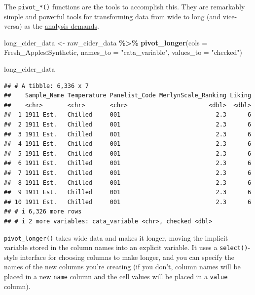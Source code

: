 \documentclass[
]{book}
\newenvironment{Shaded}{\begin{snugshade}}{\end{snugshade}}
\newcommand{\AttributeTok}[1]{\textcolor[rgb]{0.13,0.29,0.53}{#1}}
\newcommand{\FunctionTok}[1]{\textcolor[rgb]{0.13,0.29,0.53}{\textbf{#1}}}
\newcommand{\NormalTok}[1]{#1}
\newcommand{\OtherTok}[1]{\textcolor[rgb]{0.56,0.35,0.01}{#1}}
\newcommand{\SpecialCharTok}[1]{\textcolor[rgb]{0.81,0.36,0.00}{\textbf{#1}}}
\newcommand{\StringTok}[1]{\textcolor[rgb]{0.31,0.60,0.02}{#1}}
\begin{document}
The \texttt{pivot\_*()} functions are the tools to accomplish this. They are remarkably simple and powerful tools for transforming data from wide to long (and vice-versa) as the \protect\hyperlink{cider}{analysis demands}.

\begin{Shaded}
\begin{Highlighting}[]
\NormalTok{long\_cider\_data }\OtherTok{\textless{}{-}} 
\NormalTok{  raw\_cider\_data }\SpecialCharTok{\%\textgreater{}\%}
  \FunctionTok{pivot\_longer}\NormalTok{(}\AttributeTok{cols =}\NormalTok{ Fresh\_Apples}\SpecialCharTok{:}\NormalTok{Synthetic,}
               \AttributeTok{names\_to =} \StringTok{"cata\_variable"}\NormalTok{,}
               \AttributeTok{values\_to =} \StringTok{"checked"}\NormalTok{)}

\NormalTok{long\_cider\_data}
\end{Highlighting}
\end{Shaded}

\begin{verbatim}
## # A tibble: 6,336 x 7
##    Sample_Name Temperature Panelist_Code MerlynScale_Ranking Liking
##    <chr>       <chr>       <chr>                       <dbl>  <dbl>
##  1 1911 Est.   Chilled     001                           2.3      6
##  2 1911 Est.   Chilled     001                           2.3      6
##  3 1911 Est.   Chilled     001                           2.3      6
##  4 1911 Est.   Chilled     001                           2.3      6
##  5 1911 Est.   Chilled     001                           2.3      6
##  6 1911 Est.   Chilled     001                           2.3      6
##  7 1911 Est.   Chilled     001                           2.3      6
##  8 1911 Est.   Chilled     001                           2.3      6
##  9 1911 Est.   Chilled     001                           2.3      6
## 10 1911 Est.   Chilled     001                           2.3      6
## # i 6,326 more rows
## # i 2 more variables: cata_variable <chr>, checked <dbl>
\end{verbatim}

\texttt{pivot\_longer()} takes wide data and makes it longer, moving the implicit variable stored in the column names into an explicit variable. It uses a \texttt{select()}-style interface for choosing columns to make longer, and you can specify the names of the new columns you're creating (if you don't, column names will be placed in a new \texttt{name} column and the cell values will be placed in a \texttt{value} column).
\end{document}

